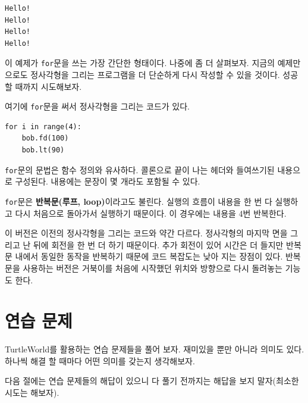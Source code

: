 \documentclass[10pt]{book}
\begin{document}
\begin{verbatim}
Hello!
Hello!
Hello!
Hello!
\end{verbatim}
%
이 예제가 {\tt for}문을 쓰는 가장 간단한 형태이다.  나중에 좀 더
살펴보자.  지금의 예제만으로도 정사각형을 그리는 프로그램을 더 단순하게
다시 작성할 수 있을 것이다.  성공할 때까지 시도해보자.

여기에 {\tt for}문을 써서 정사각형을 그리는 코드가 있다. 


\begin{verbatim}
for i in range(4):
    bob.fd(100)
    bob.lt(90)
\end{verbatim}
%
{\tt for}문의 문법은 함수 정의와 유사하다.  콜론으로 끝이 나는
헤더와 들여쓰기된 내용으로 구성된다.  내용에는 문장이 몇 개라도 포함될
수 있다.

{\tt for}문은 {\bf 반복문(루프, loop)}이라고도 불린다.  실행의
흐름이 내용을 한 번 다 실행하고 다시 처음으로 돌아가서 실행하기
때문이다.  이 경우에는 내용을 4번 반복한다.

이 버전은 이전의 정사각형을 그리는 코드와 약간 다르다.  정사각형의
마지막 면을 그리고 난 뒤에 회전을 한 번 더 하기 때문이다.  추가 회전이
있어 시간은 더 들지만 반복문 내에서 동일한 동작을 반복하기 때문에 코드
복잡도는 낮아 지는 장점이 있다.  반복문을 사용하는 버전은 거북이를
처음에 시작했던 위치와 방향으로 다시 돌려놓는 기능도 한다.  

\section{연습 문제}

TurtleWorld를 활용하는 연습 문제들을 풀어 보자.  재미있을 뿐만 아니라
의미도 있다.  하나씩 해결 할 때마다 어떤 의미를 갖는지 생각해보자.

다음 절에는 연습 문제들의 해답이 있으니 다 풀기 전까지는 해답을 보지
말자(최소한 시도는 해보자).
\end{document}
